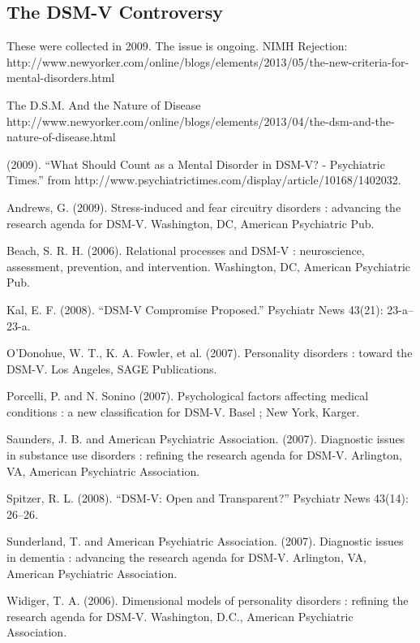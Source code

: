 \subsection{The DSM-V Controversy}
\label{thedsm-vcontroversy}

These were collected in 2009. The issue is ongoing.
NIMH Rejection: http:\slash \slash www.newyorker.com\slash online\slash blogs\slash elements\slash 2013\slash 05\slash the-new-criteria-for-mental-disorders.html 

The D.S.M. And the Nature of Disease
http:\slash \slash www.newyorker.com\slash online\slash blogs\slash elements\slash 2013\slash 04\slash the-dsm-and-the-nature-of-disease.html 

(2009). ``What Should Count as a Mental Disorder in DSM-V? - Psychiatric Times.'' from http:\slash \slash www.psychiatrictimes.com\slash display\slash article\slash 10168\slash 1402032.

Andrews, G. (2009). Stress-induced and fear circuitry disorders : advancing the research agenda for DSM-V. Washington, DC, American Psychiatric Pub.

Beach, S. R. H. (2006). Relational processes and DSM-V : neuroscience, assessment, prevention, and intervention. Washington, DC, American Psychiatric Pub.

Kal, E. F. (2008). ``DSM-V Compromise Proposed.'' Psychiatr News 43(21): 23-a--23-a.

O'Donohue, W. T., K. A. Fowler, et al. (2007). Personality disorders : toward the DSM-V. Los Angeles, SAGE Publications.

Porcelli, P. and N. Sonino (2007). Psychological factors affecting medical conditions : a new classification for DSM-V. Basel ; New York, Karger.

Saunders, J. B. and American Psychiatric Association. (2007). Diagnostic issues in substance use disorders : refining the research agenda for DSM-V. Arlington, VA, American Psychiatric Association.

Spitzer, R. L. (2008). ``DSM-V: Open and Transparent?'' Psychiatr News 43(14): 26--26.

Sunderland, T. and American Psychiatric Association. (2007). Diagnostic issues in dementia : advancing the research agenda for DSM-V. Arlington, VA, American Psychiatric Association.

Widiger, T. A. (2006). Dimensional models of personality disorders : refining the research agenda for DSM-V. Washington, D.C., American Psychiatric Association.


